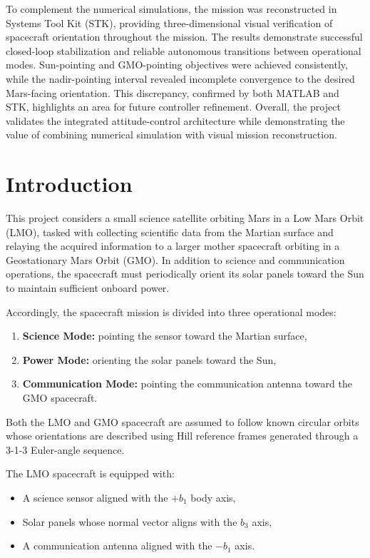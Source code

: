 \documentclass[12pt,a4paper]{report}
\begin{document}
	To complement the numerical simulations, the mission was reconstructed in Systems Tool Kit (STK), providing three-dimensional visual verification of spacecraft orientation throughout the mission. The results demonstrate successful closed-loop stabilization and reliable autonomous transitions between operational modes. Sun-pointing and GMO-pointing objectives were achieved consistently, while the nadir-pointing interval revealed incomplete convergence to the desired Mars-facing orientation. This discrepancy, confirmed by both MATLAB and STK, highlights an area for future controller refinement. Overall, the project validates the integrated attitude-control architecture while demonstrating the value of combining numerical simulation with visual mission reconstruction.
	
	
	\chapter{Introduction}
	
	This project considers a small science satellite orbiting Mars in a Low Mars Orbit (LMO), tasked with collecting scientific data from the Martian surface and relaying the acquired information to a larger mother spacecraft orbiting in a Geostationary Mars Orbit (GMO). In addition to science and communication operations, the spacecraft must periodically orient its solar panels toward the Sun to maintain sufficient onboard power.
	
	Accordingly, the spacecraft mission is divided into three operational modes:
	
	\begin{enumerate}[label=\arabic*)]
		\item \textbf{Science Mode:} pointing the sensor toward the Martian surface,
		\item \textbf{Power Mode:} orienting the solar panels toward the Sun,
		\item \textbf{Communication Mode:} pointing the communication antenna toward the GMO spacecraft.
	\end{enumerate}
	
	Both the LMO and GMO spacecraft are assumed to follow known circular orbits whose orientations are described using Hill reference frames generated through a 3-1-3 Euler-angle sequence.
	
	The LMO spacecraft is equipped with:
	
	\begin{itemize}
		\item A science sensor aligned with the $+b_1$ body axis,
		\item Solar panels whose normal vector aligns with the $b_3$ axis,
		\item A communication antenna aligned with the $-b_1$ axis.
	\end{itemize}
	
\end{document}
